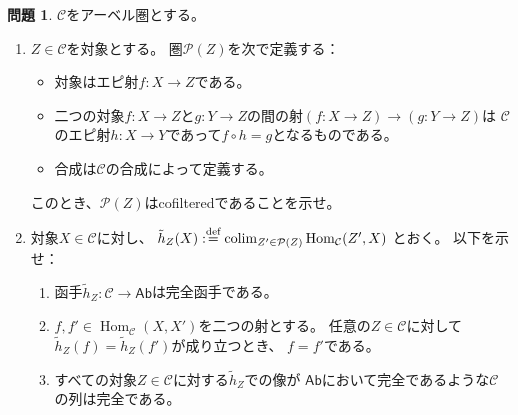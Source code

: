 \documentclass[uplatex,dvipdfmx]{jsarticle}
\theoremstyle{definition}
\newtheorem{prob}[prob]{問題}
\DeclareMathOperator{\Hom}{\mathrm{Hom}}
\DeclareMathOperator{\colim}{\mathrm{colim}}
\newcommand\mcC{\mathcal{C}}
\newcommand\mcP{\mathcal{P}}
\def\dfn{:\overset{\mbox{{\scriptsize def}}}{=}}
\begin{document}
\begin{prob}\label{1.7}
  \(\mcC\)をアーベル圏とする。
  \begin{enumerate}
    \item \label{1.7.1}
    \(Z\in \mcC\)を対象とする。
    圏\(\mcP(Z)\)を次で定義する：
    \begin{itemize}
      \item 対象はエピ射\(f:X\to Z\)である。
      \item 二つの対象\(f:X\to Z\)と\(g:Y\to Z\)の間の射\((f:X\to Z)\to (g:Y\to Z)\)は
      \(\mcC\)のエピ射\(h:X\to Y\)であって\(f\circ h = g\)となるものである。
      \item 合成は\(\mcC\)の合成によって定義する。
    \end{itemize}
    このとき、\(\mcP(Z)\)はcofilteredであることを示せ。
    \item \label{1.7.2}
    対象\(X\in \mcC\)に対し、
    \(\tilde{h}_Z(X) \dfn \colim_{Z'\in \mcP(Z)}\Hom_{\mcC}(Z',X)\)
    とおく。
    以下を示せ：
    \begin{enumerate}
      \item \label{1.7.2.1}
      函手\(\tilde{h}_Z:\mcC \to \mathsf{Ab}\)は完全函手である。
      \item \label{1.7.2.2}
      \(f,f'\in \Hom_{\mcC}(X,X')\)を二つの射とする。
      任意の\(Z\in \mcC\)に対して
      \(\tilde{h}_Z(f) = \tilde{h}_Z(f')\)が成り立つとき、
      \(f=f'\)である。
      \item \label{1.7.2.3}
      すべての対象\(Z\in \mcC\)に対する\(\tilde{h}_Z\)での像が
      \(\mathsf{Ab}\)において完全であるような\(\mcC\)の列は完全である。
    \end{enumerate}
  \end{enumerate}
\end{prob}
\end{document}
